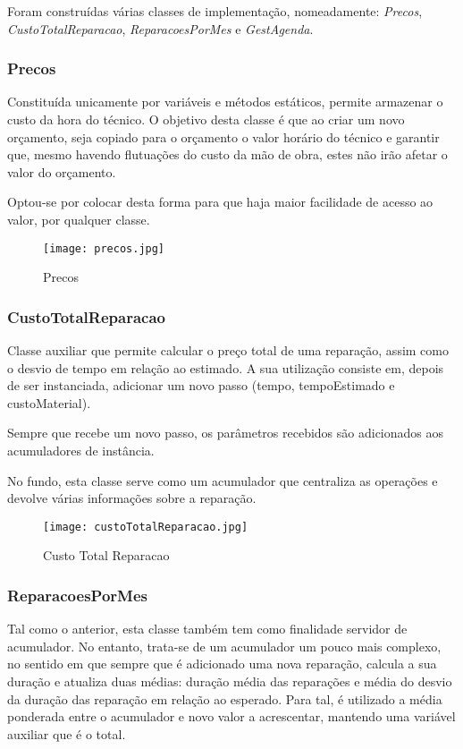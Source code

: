 \documentclass[../../relatorio.tex]{subfiles}
\begin{document}
Foram construídas várias classes de implementação, nomeadamente:
\textit{Precos}, \textit{CustoTotalReparacao},
\textit{ReparacoesPorMes} e \textit{GestAgenda}.

\subsubsection*{Precos} \label{class:precos}
Constituída unicamente por variáveis e métodos estáticos, permite
armazenar o custo da hora do técnico.
O objetivo desta classe é que ao criar um novo orçamento, seja copiado para o orçamento
o valor horário do técnico e garantir que, mesmo havendo flutuações do custo
da mão de obra, estes não irão afetar o valor do orçamento.

Optou-se por colocar desta forma para que haja maior facilidade de acesso ao valor,
por qualquer classe.

\begin{figure} [!ht]
    \centering
    \texttt{[image: precos.jpg]}
    \caption{Precos}\label{img:precos}
\end{figure}

\subsubsection*{CustoTotalReparacao} \label{class:custo_total_reparacao}
Classe auxiliar que permite calcular o preço total de uma reparação,
assim como o desvio de tempo em relação ao estimado.
A sua utilização consiste em, depois de ser instanciada, adicionar um novo passo
(tempo, tempoEstimado e custoMaterial).

Sempre que recebe um novo passo, os parâmetros recebidos são adicionados
aos acumuladores de instância.

No fundo, esta classe serve como um acumulador que centraliza as operações e
devolve várias informações sobre a reparação.

\begin{figure} [!ht]
    \centering
    \texttt{[image: custoTotalReparacao.jpg]}
    \caption{Custo Total Reparacao}\label{img:custo_total_reparacao}
\end{figure}

\subsubsection*{ReparacoesPorMes} \label{class:reparacoes_por_mes}
Tal como o anterior, esta classe também tem como finalidade servidor de acumulador.
No entanto, trata-se de um acumulador um pouco mais complexo, no sentido
em que sempre que é adicionado uma nova reparação, calcula a sua duração
e atualiza duas médias: duração média das reparações e média do desvio
da duração das reparação em relação ao esperado.
Para tal, é utilizado a média ponderada entre o acumulador e novo valor a acrescentar,
mantendo uma variável auxiliar que é o total.
\end{document}
